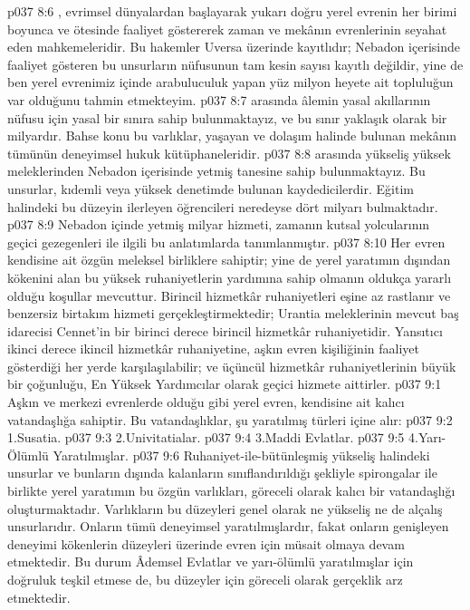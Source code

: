\vs p037 8:6 , evrimsel dünyalardan başlayarak yukarı doğru yerel evrenin her birimi boyunca ve ötesinde faaliyet göstererek zaman ve mekânın evrenlerinin seyahat eden mahkemeleridir. Bu hakemler Uversa üzerinde kayıtlıdır; Nebadon içerisinde faaliyet gösteren bu unsurların nüfusunun tam kesin sayısı kayıtlı değildir, yine de ben yerel evrenimiz içinde arabuluculuk yapan yüz milyon heyete ait topluluğun var olduğunu tahmin etmekteyim.
\vs p037 8:7  arasında âlemin yasal akıllarının nüfusu için yasal bir sınıra sahip bulunmaktayız, ve bu sınır yaklaşık olarak bir milyardır. Bahse konu bu varlıklar, yaşayan ve dolaşım halinde bulunan mekânın tümünün deneyimsel hukuk kütüphaneleridir.
\vs p037 8:8  arasında yükseliş yüksek meleklerinden Nebadon içerisinde yetmiş tanesine sahip bulunmaktayız. Bu unsurlar, kıdemli veya yüksek denetimde bulunan kaydedicilerdir. Eğitim halindeki bu düzeyin ilerleyen öğrencileri neredeyse dört milyarı bulmaktadır.
\vs p037 8:9 Nebadon içinde yetmiş milyar hizmeti, zamanın kutsal yolcularının geçici gezegenleri ile ilgili bu anlatımlarda tanımlanmıştır.
\vs p037 8:10 Her evren kendisine ait özgün meleksel birliklere sahiptir; yine de yerel yaratımın dışından kökenini alan bu yüksek ruhaniyetlerin yardımına sahip olmanın oldukça yararlı olduğu koşullar mevcuttur. Birincil hizmetkâr ruhaniyetleri eşine az rastlanır ve benzersiz birtakım hizmeti gerçekleştirmektedir; Urantia meleklerinin mevcut baş idarecisi Cennet’in bir birinci derece birincil hizmetkâr ruhaniyetidir. Yansıtıcı ikinci derece ikincil hizmetkâr ruhaniyetine, aşkın evren kişiliğinin faaliyet gösterdiği her yerde karşılaşılabilir; ve üçüncül hizmetkâr ruhaniyetlerinin büyük bir çoğunluğu, En Yüksek Yardımcılar olarak geçici hizmete aittirler.
\vs p037 9:1 Aşkın ve merkezi evrenlerde olduğu gibi yerel evren, kendisine ait kalıcı vatandaşlığa sahiptir. Bu vatandaşlıklar, şu yaratılmış türleri içine alır:
\vs p037 9:2 1.\bibnobreakspace Susatia.
\vs p037 9:3 2.\bibnobreakspace Univitatialar.
\vs p037 9:4 3.\bibnobreakspace Maddi Evlatlar.
\vs p037 9:5 4.\bibnobreakspace Yarı\hyp{}Ölümlü Yaratılmışlar.
\vs p037 9:6 Ruhaniyet\hyp{}ile\hyp{}bütünleşmiş yükseliş halindeki unsurlar ve bunların dışında kalanların sınıflandırıldığı şekliyle spirongalar ile birlikte yerel yaratımın bu özgün varlıkları, göreceli olarak kalıcı bir vatandaşlığı oluşturmaktadır. Varlıkların bu düzeyleri genel olarak ne yükseliş ne de alçalış unsurlarıdır. Onların tümü deneyimsel yaratılmışlardır, fakat onların genişleyen deneyimi kökenlerin düzeyleri üzerinde evren için müsait olmaya devam etmektedir. Bu durum Âdemsel Evlatlar ve yarı\hyp{}ölümlü yaratılmışlar için doğruluk teşkil etmese de, bu düzeyler için göreceli olarak gerçeklik arz etmektedir.
